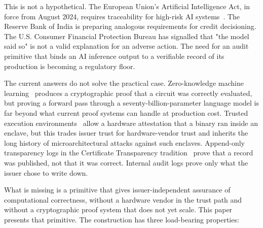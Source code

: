 \documentclass[10pt]{article}
\begin{document}
This is not a hypothetical. The European Union's Artificial Intelligence Act, in force from August 2024, requires traceability for high-risk AI systems~\cite{euaia2024}. The Reserve Bank of India is preparing analogous requirements for credit decisioning. The U.S. Consumer Financial Protection Bureau has signalled that "the model said so" is not a valid explanation for an adverse action. The need for an audit primitive that binds an AI inference output to a verifiable record of its production is becoming a regulatory floor.

The current answers do not solve the practical case. Zero-knowledge machine learning~\cite{ezkl, risczero} produces a cryptographic proof that a circuit was correctly evaluated, but proving a forward pass through a seventy-billion-parameter language model is far beyond what current proof systems can handle at production cost. Trusted execution environments~\cite{sgx, h100cc} allow a hardware attestation that a binary ran inside an enclave, but this trades issuer trust for hardware-vendor trust and inherits the long history of microarchitectural attacks against such enclaves. Append-only transparency logs in the Certificate Transparency tradition~\cite{ct} prove that a record was published, not that it was correct. Internal audit logs prove only what the issuer chose to write down.

What is missing is a primitive that gives issuer-independent assurance of computational correctness, without a hardware vendor in the trust path and without a cryptographic proof system that does not yet scale. This paper presents that primitive. The construction has three load-bearing properties:
\end{document}
